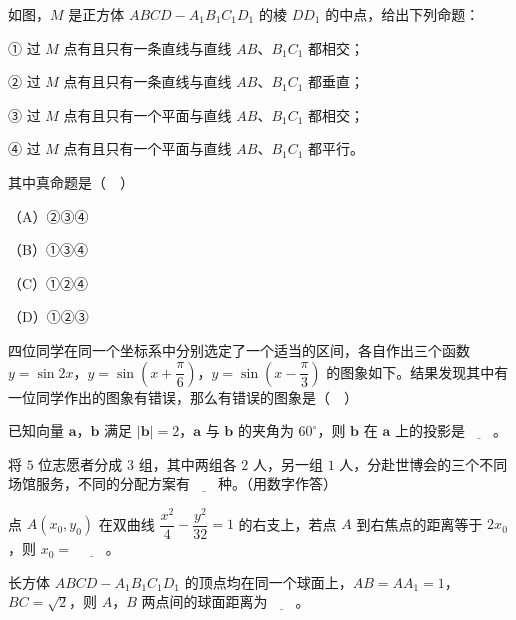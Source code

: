 \begin{question}
如图，$M$ 是正方体 $ABCD-A_1B_1C_1D_1$ 的棱 $DD_1$ 的中点，给出下列命题：

① 过 $M$ 点有且只有一条直线与直线 $AB$、$B_1C_1$ 都相交；

② 过 $M$ 点有且只有一条直线与直线 $AB$、$B_1C_1$ 都垂直；

③ 过 $M$ 点有且只有一个平面与直线 $AB$、$B_1C_1$ 都相交；

④ 过 $M$ 点有且只有一个平面与直线 $AB$、$B_1C_1$ 都平行。

其中真命题是（　）

（A）②③④

（B）①③④

（C）①②④

（D）①②③
\nopagebreak[4]
\begin{center}\end{center}
\nopagebreak[4]
\Needspace{0.4\textheight}
\end{question}
\endgroup
\begingroup
\renewenvironment{question}{\Needspace{0.5\textheight}}{}
\begin{question}
四位同学在同一个坐标系中分别选定了一个适当的区间，各自作出三个函数 $y=\sin2x$，$y=\sin\left(x+\dfrac\pi6\right)$，$y=\sin\left(x-\dfrac\pi3\right)$ 的图象如下。结果发现其中有一位同学作出的图象有错误，那么有错误的图象是（　）
\nopagebreak[4]
\begin{center}\end{center}
\nopagebreak[4]
\end{question}
\endgroup
{}

\begin{question}
已知向量 $\boldsymbol a$，$\boldsymbol b$ 满足 $|\boldsymbol b|=2$，$\boldsymbol a$ 与 $\boldsymbol b$ 的夹角为 $60^\circ$，则 $\boldsymbol b$ 在 $\boldsymbol a$ 上的投影是$\underline{\qquad}$。

\end{question}
\begin{question}
将 $5$ 位志愿者分成 $3$ 组，其中两组各 $2$ 人，另一组 $1$ 人，分赴世博会的三个不同场馆服务，不同的分配方案有$\underline{\qquad}$种。（用数字作答）

\end{question}
\begin{question}
点 $A(x_0,y_0)$ 在双曲线 $\dfrac{x^2}{4}-\dfrac{y^2}{32}=1$ 的右支上，若点 $A$ 到右焦点的距离等于 $2x_0$，则 $x_0=$ $\underline{\qquad}$。

\Needspace{0.4\textheight}
\end{question}
\begingroup
\renewenvironment{question}{\Needspace{0.5\textheight}}{}
\begin{question}
长方体 $ABCD-A_1B_1C_1D_1$ 的顶点均在同一个球面上，$AB=AA_1=1$，$BC=\sqrt2$，则 $A$，$B$ 两点间的球面距离为$\underline{\qquad}$。
\nopagebreak[4]
\begin{center}\end{center}
\nopagebreak[4]
\end{question}
\endgroup
{}

